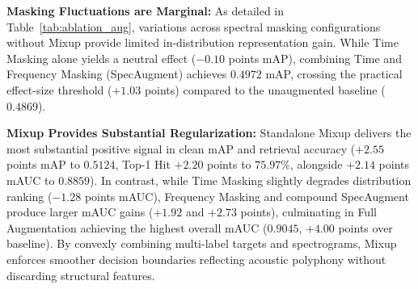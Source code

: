 \documentclass[11pt,a4paper]{article}
\begin{document}
\begin{table}[htbp]
\centering
\caption{Setup 3.1: Systematic Augmentation Ablation Grid on Held-Out FSD50K (10,231 Evaluation Clips, ViT-Tiny CLS+DIST Backbone). F1 metrics evaluated at default uncalibrated decision threshold $\tau=0.50$.}
\label{tab:ablation_aug}
\vspace{2mm}
\end{table}

\textbf{Masking Fluctuations are Marginal:} As detailed in Table~\ref{tab:ablation_aug}, variations across spectral masking configurations without Mixup provide limited in-distribution representation gain. While Time Masking alone yields a neutral effect ($-0.10$ points mAP), combining Time and Frequency Masking (SpecAugment) achieves $0.4972$ mAP, crossing the practical effect-size threshold ($+1.03$ points) compared to the unaugmented baseline ($0.4869$).

\textbf{Mixup Provides Substantial Regularization:} Standalone Mixup delivers the most substantial positive signal in clean mAP and retrieval accuracy ($+2.55$ points mAP to $0.5124$, Top-1 Hit $+2.20$ points to $75.97\%$, alongside $+2.14$ points mAUC to $0.8859$). In contrast, while Time Masking slightly degrades distribution ranking ($-1.28$ points mAUC), Frequency Masking and compound SpecAugment produce larger mAUC gains ($+1.92$ and $+2.73$ points), culminating in Full Augmentation achieving the highest overall mAUC ($0.9045$, $+4.00$ points over baseline). By convexly combining multi-label targets and spectrograms, Mixup enforces smoother decision boundaries reflecting acoustic polyphony without discarding structural features.
\end{document}

